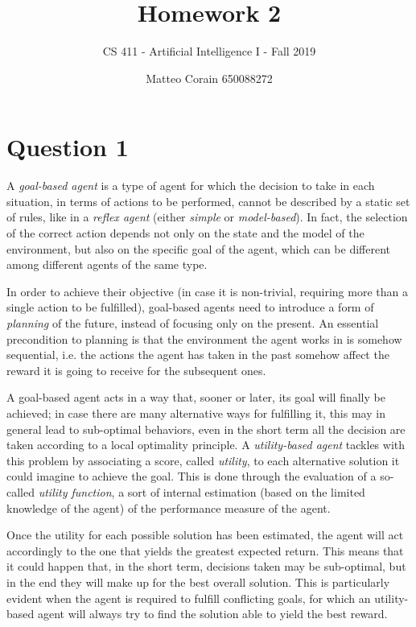 \documentclass[letterpaper,headings=standardclasses]{scrartcl}
\title{Homework 2}
\subtitle{CS 411 - Artificial Intelligence I - Fall 2019}
\author{Matteo Corain 650088272}
\begin{document}
\maketitle

\section{Question 1}

A \emph{goal-based agent} is a type of agent for which the decision to take in each situation, in terms of actions to be performed, cannot be described by a static set of rules, like in a \emph{reflex agent} (either \emph{simple} or \emph{model-based}). In fact, the selection of the correct action depends not only on the state and the model of the environment, but also on the specific goal of the agent, which can be different among different agents of the same type.

In order to achieve their objective (in case it is non-trivial, requiring more than a single action to be fulfilled), goal-based agents need to introduce a form of \emph{planning} of the future, instead of focusing only on the present. An essential precondition to planning is that the environment the agent works in is somehow sequential, i.e. the actions the agent has taken in the past somehow affect the reward it is going to receive for the subsequent ones.

A goal-based agent acts in a way that, sooner or later, its goal will finally be achieved; in case there are many alternative ways for fulfilling it, this may in general lead to sub-optimal behaviors, even in the short term all the decision are taken according to a local optimality principle. A \emph{utility-based agent} tackles with this problem by associating a score, called \emph{utility}, to each alternative solution it could imagine to achieve the goal. This is done through the evaluation of a so-called \emph{utility function}, a sort of internal estimation (based on the limited knowledge of the agent) of the performance measure of the agent.

Once the utility for each possible solution has been estimated, the agent will act accordingly to the one that yields the greatest expected return. This means that it could happen that, in the short term, decisions taken may be sub-optimal, but in the end they will make up for the best overall solution. This is particularly evident when the agent is required to fulfill conflicting goals, for which an utility-based agent will always try to find the solution able to yield the best reward.
\end{document}
